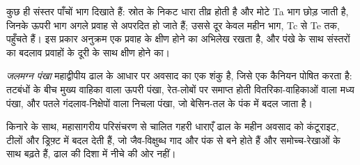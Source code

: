 कुछ ही संस्तर पाँचों भाग दिखाते हैं: स्रोत के निकट धारा तीव्र होती है और मोटे Ta भाग छोड़ जाती है,
जिनके ऊपरी भाग अगले प्रवाह से अपरदित हो जाते हैं; उससे दूर केवल
महीन भाग, Tc से Te तक, पहुँचते हैं। इस प्रकार अनुक्रम एक प्रवाह के
क्षीण होने का अभिलेख रखता है, और पंखे के साथ संस्तरों का बदलाव प्रवाहों के
दूरी के साथ क्षीण होने का।

\begin{definition}[जलमग्न पंखा]\label{def:b3:facies-models:fan}
\emph{जलमग्न पंखा} महाद्वीपीय ढाल के आधार पर अवसाद का एक शंकु है,
जिसे एक कैनियन पोषित करता है: तटबंधों के बीच मुख्य वाहिका वाला ऊपरी पंखा,
रेत-लोबों पर समाप्त होती वितरिका-वाहिकाओं वाला मध्य पंखा,
और पतले गंदलाव-निक्षेपों वाला निचला पंखा, जो बेसिन-तल के पंक में बदल जाता है।
\end{definition}

किनारे के साथ, महासागरीय परिसंचरण से चालित गहरी धाराएँ ढाल के
महीन अवसाद को कंटूराइट, टीलों और ड्रिफ़्ट में बदल देती हैं, जो जैव-विक्षुब्ध गाद और
पंक से बने होते हैं और समोच्च-रेखाओं के साथ बढ़ते हैं, ढाल की दिशा में
नीचे की ओर नहीं।

